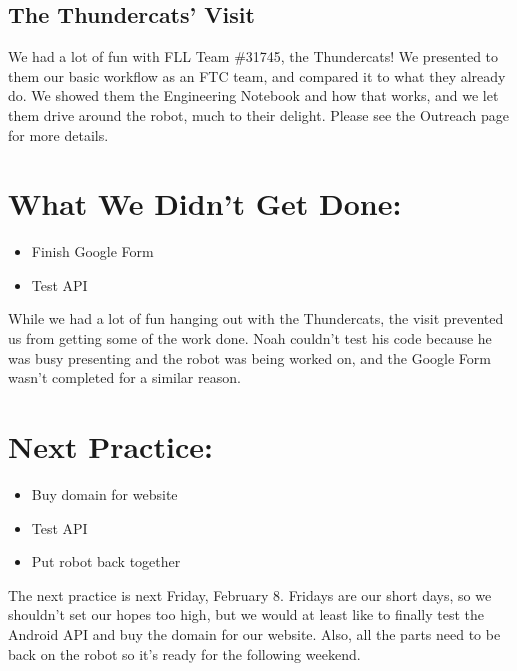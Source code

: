 \documentclass[12pt]{article}
\begin{document}
\subsection{The Thundercats' Visit}
We had a lot of fun with FLL Team \#31745, the Thundercats! We presented to them our basic workflow as an FTC team, and compared it to what they already do. We showed them the Engineering Notebook and how that works, and we let them drive around the robot, much to their delight. Please see the Outreach page for more details.

\section{What We Didn't Get Done:} %
\begin{itemize}
	\item Finish Google Form
	\item Test API
\end{itemize}

While we had a lot of fun hanging out with the Thundercats, the visit prevented us from getting some of the work done. Noah couldn't test his code because he was busy presenting and the robot was being worked on, and the Google Form wasn't completed for a similar reason.

\section{Next Practice:}
\begin{itemize}
	\item Buy domain for website
	\item Test API
	\item Put robot back together
\end{itemize}

The next practice is next Friday, February 8. %
Fridays are our short days, so we shouldn't set our hopes too high, but we would at least like to finally test the Android API and buy the domain for our website. Also, all the parts need to be back on the robot so it's ready for the following weekend.
\end{document}
